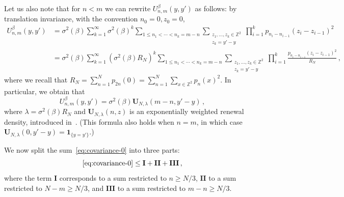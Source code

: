 \documentclass[11pt]{amsart}
\numberwithin{equation}{section}
\newcommand*{\ind}{\mathbf{1}}
\newcommand*{\numberset}{\mathbb}
\newcommand*{\Z}{\numberset{Z}}
\theoremstyle{plain}
\theoremstyle{definition}
\theoremstyle{remark}
\begin{document}
Let us also note that for \(n<m\) we can rewrite \(U_{n,m}^{\beta} (y,y')\) as follows: by translation invariance, with the convention \(n_0=0,z_0=0\), 
\[
\begin{split}
       U_{n,m}^{\beta} (y,y')
       &  =  \sigma^2(\beta) \sum_{k=1}^{\infty}\sigma^2(\beta)^k \sum_{1\leq n_1<\cdots < n_k = m-n} \sum_{\substack{z_1,\ldots, z_k \in \Z^2\\ z_k=y'-y}} \prod_{i=1}^k p_{n_i-n_{i-1}}(z_i-z_{i-1})^2 \\
       & =\sigma^2(\beta) \sum_{k=1}^{\infty} (\sigma^2(\beta) R_N)^k \sum_{1\leq n_1<\cdots < n_k = m-n} \sum_{\substack{z_1,\ldots, z_k \in \Z^2\\ z_k=y'-y}} \prod_{i=1}^k \frac{p_{n_i-n_{i-1}}(z_i-z_{i-1})^2}{R_N} \,,
\end{split}
\]
where we recall that \(R_N= \sum_{n=1}^N p_{2n}(0) = \sum_{n=1}^{N} \sum_{x\in \Z^2} p_n(x)^2\).
In particular, we obtain that
\begin{equation}
       \label{eq:renewal-density}
       U_{n,m}^{\beta} (y,y') = \sigma^2(\beta) \mathbf{U}_{N,\lambda} (m-n,y'-y) \,,
\end{equation}
where \(\lambda = \sigma^2(\beta) R_N\) and \(\mathbf{U}_{N,\lambda} (n,z)\) is an exponentially weighted renewal density, introduced in~\cite[Eq.~(3.21)]{CSZ19b}. (This formula also holds when \(n=m\), in which case \(\mathbf{U}_{N,\lambda} (0,y'-y)= \ind_{\{y=y'\}}\).)


We now split the sum~\eqref{eq:covariance-0} into three parts:
\[
 \text{\eqref{eq:covariance-0}} \leq \mathbf{I} + \mathbf{II} + \mathbf{III} \,,
\]
where the term \(\mathbf{I}\) corresponds to a sum restricted to \(n\geq N/3\), \(\mathbf{II}\) to a sum restricted to \(N-m\geq N/3\), and \(\mathbf{III}\) to a sum restricted to \(m-n\geq N/3\).


\end{document}

